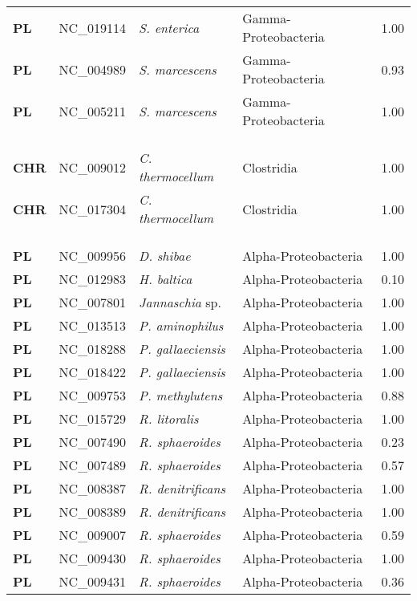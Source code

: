 \begin{adjustwidth}{-3cm}{2cm}
{\begin{supertabular}{>{\bfseries}l|p{0.1\textwidth}p{0.14\textwidth}l|l}
PL & NC\_019114 & \textit{S. enterica} & Gamma-Proteobacteria & 1.00\\
PL & NC\_004989 & \textit{S. marcescens} & Gamma-Proteobacteria & 0.93\\
PL & NC\_005211 & \textit{S. marcescens} & Gamma-Proteobacteria & 1.00\\
\\
\\
\hline\\
CHR & NC\_009012 & \textit{C. thermocellum} & Clostridia & 1.00\\
CHR & NC\_017304 & \textit{C. thermocellum} & Clostridia & 1.00\\
\\
\\
\hline\\
PL & NC\_009956 & \textit{D. shibae} & Alpha-Proteobacteria & 1.00\\
PL & NC\_012983 & \textit{H. baltica} & Alpha-Proteobacteria & 0.10\\
PL & NC\_007801 & \textit{Jannaschia} sp. & Alpha-Proteobacteria & 1.00\\
PL & NC\_013513 & \textit{P. aminophilus} & Alpha-Proteobacteria & 1.00\\
PL & NC\_018288 & \textit{P. gallaeciensis} & Alpha-Proteobacteria & 1.00\\
PL & NC\_018422 & \textit{P. gallaeciensis} & Alpha-Proteobacteria & 1.00\\
PL & NC\_009753 & \textit{P. methylutens} & Alpha-Proteobacteria & 0.88\\
PL & NC\_015729 & \textit{R. litoralis} & Alpha-Proteobacteria & 1.00\\
PL & NC\_007490 & \textit{R. sphaeroides} & Alpha-Proteobacteria & 0.23\\
PL & NC\_007489 & \textit{R. sphaeroides} & Alpha-Proteobacteria & 0.57\\
PL & NC\_008387 & \textit{R. denitrificans} & Alpha-Proteobacteria & 1.00\\
PL & NC\_008389 & \textit{R. denitrificans} & Alpha-Proteobacteria & 1.00\\
PL & NC\_009007 & \textit{R. sphaeroides} & Alpha-Proteobacteria & 0.59\\
PL & NC\_009430 & \textit{R. sphaeroides} & Alpha-Proteobacteria & 1.00\\
PL & NC\_009431 & \textit{R. sphaeroides} & Alpha-Proteobacteria & 0.36\\

\end{supertabular}}
\end{adjustwidth}

